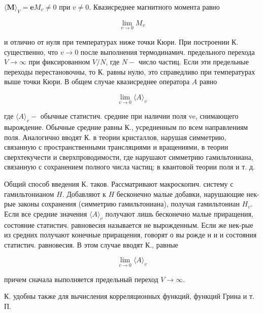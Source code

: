 \documentclass[10pt]{article}
\begin{document}
$\langle\boldsymbol{M}\rangle_{V}=\boldsymbol{e} M_{v} \neq 0$ при $v \neq 0$. Квазисреднее магнитного момента равно



\[

\lim _{v \rightarrow 0} M_{v}

\]



и отлично от нуля при температурах ниже точки Кюри. При построении К. существенно, что $v \rightarrow 0$ после выполнения термодинамич. предельного перехода $V \rightarrow \infty$ при фиксированном $V / N$, где $N-$ число частиц. Если эти предельные переходы перестановочны, то К. равны нулю, это справедливо при температурах выше точки Кюри. В общем случае квазисреднее оператора $A$ равно



\[

\lim _{v \rightarrow 0}\langle A\rangle_{v}

\]



где $\langle A\rangle_{v}-$ обычные статистич. средние при наличии поля ve, снимающего вырождение. Обычные средние равны К., усредненным по всем направлениям поля. Аналогично вводят К. в теории кристаллов, нарушая симметрию, связанную с пространственными трансляциями и вращениями, в теории сверхтекучести и сверхпроводимости, где нарушают симметрию гамильтониана, связанную с сохранением полного числа частиц; в квантовой теории поля и т. д.



Общий способ введения К. таков. Рассматривают макроскопич. систему с гамильтонианом $H$. Добавляют к $H$ бесконечно малые добавки, нарушающие нек-рые законы сохранения (симметрию гамильтониана), получая гамильтониан $H_{v}$. Если все средние значения $\langle A\rangle_{v}$ получают лишь бесконечно малые приращения, состояние статистич. равновесия называется не вырожденным. Если же нек-рые из средних получают конечные приращения, говорят о вы рожде н и и состояния статистич. равновесия. В этом случае вводят К., равные



\[

\lim _{v \rightarrow 0}\langle A\rangle_{v}

\]



причем сначала выполняется предельный переход $V \rightarrow \infty$.



К. удобны также для вычисления корреляционных функций, функций Грина и т. П.
\end{document}
